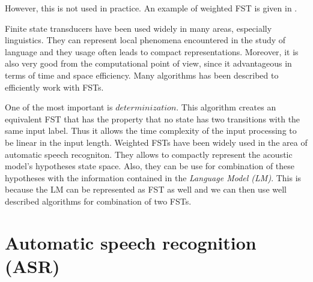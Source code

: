 However, this is not used in practice.
An example of weighted FST is given in .
\par
Finite state transducers have been used widely in many areas, especially linguistics.
They can represent local phenomena encountered in the study of language and they usage often leads to compact representations.
Moreover, it is also very good from the computational point of view, since it advantageous in terms of time and space efficiency.
Many algorithms has been described to efficiently work with FSTs.
\par
One of the most important is $determinization$.
This algorithm creates an equivalent FST that has the property that no state has two transitions with the same input label.
Thus it allows the time complexity of the input processing to be linear in the input length.
Weighted FSTs have been widely used in the area of automatic speech recogniton.
They allows to compactly represent the acoustic model's hypotheses state space.
Also, they can be use for combination of these hypotheses with the information contained in the \textit{Language Model (LM)}.
This is because the LM can be represented as FST as well and we can then use well described algorithms for combination of two FSTs.
\section{Automatic speech recognition (ASR)}
\label{ASR-desc}
